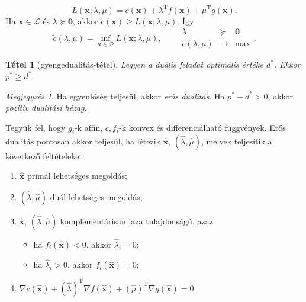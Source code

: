 \documentclass[DIV=15,appendixprefix]{scrreprt}
\newtheorem*{tetel}{Tétel}
\theoremstyle{definition}
\theoremstyle{remark}
\newtheorem*{megj}{Megjegyzés}
\DeclareMathOperator{\T}{T}
\begin{document}
%
\begin{equation*}\tag{Lagrange-függvény}
	L \left( \mathbf{ x };{} \lambda,{} \mu \right) = c \left( \mathbf{ x } \right) + \lambda^{ \T }
	f \left( \mathbf{ x }	\right) + \mu^{ \T } g \left( \mathbf{ x }	\right).
\end{equation*}
Ha $ \mathbf{ x } \in \mathcal{ L } $ és $ \lambda \succeq \mathbf{ 0 } $, akkor $ c \left(
\mathbf{ x } \right) \ge L \left( \mathbf{ x };{} \lambda,{} \mu \right) $. Így
\begin{equation}\tag{duális célfüggény, duális feladat}
	\tilde{ c } \left( \lambda,{} \mu \right) = \inf_{ \mathbf{ x } \in \mathcal{ D } } L \left(
	\mathbf{ x };{} \lambda,{} \mu \right), \qquad \begin{array}{rcl}
		\lambda										&		\succeq	&	\mathbf{ 0 }\\
		\hline
		\tilde{ c } \left( \lambda,{} \mu \right)	&	\rightarrow	&	\max
	\end{array}.
\end{equation}
\begin{tetel}[gyengedualitás-tétel]
	Legyen a duális feladat optimális értéke $ d^{ * } $. Ekkor $ p^{ * } \ge d^{ * } $.
\end{tetel}
\begin{megj}
	Ha egyenlőség teljesül, akkor \emph{erős dualitás}. Ha $ p^{ * } - d^{ * } > 0 $, akkor
	\emph{pozitív dualitási hézag}.
\end{megj}
%
Tegyük fel, hogy $ g_{ i } $-k affin, $ c,{} f_{ i } $-k konvex és differenciálható függvények. Erős dualitás pontosan akkor teljesül, ha létezik $ \hat{ \mathbf{ x } } $, $ \left( \hat{ \lambda }
,{} \hat{ \mu } \right) $, melyek teljesítik a következő feltételeket:
\begin{enumerate}[label = (KKT--\arabic{*}), ref = KKT--\arabic{*}, mode = unboxed,%
	labelindent = \parindent, leftmargin = *]
	\item\label{kkt1} $ \hat{ \mathbf{ x } } $ primál lehetséges megoldás;
	\item\label{kkt2} $ \left( \hat{ \lambda },{} \hat{ \mu } \right) $ duál lehetséges megoldás;
	\item\label{kkt3} $ \hat{ \mathbf{ x } } $, $ \left( \hat{ \lambda },{} \hat{ \mu } \right) $
	komplementárisan laza tulajdonságú, azaz
		\begin{itemize}
			\item ha $ f_{ i } \left( \hat{ \mathbf{ x } } \right) < 0 $, akkor
				$ \hat{ \lambda }_{ i } = 0 $;
			\item ha $ \hat{ \lambda }_{ i } > 0 $, akkor $ f_{ i } \left( \hat{ \mathbf{ x } }
				\right) = 0 $;
		\end{itemize}
	\item\label{kkt4} $ \nabla c \left( \hat{ \mathbf{ x } } \right) + \left( \hat{ \lambda }
		\right)^{ \T } \nabla f \left( \hat{ \mathbf{ x } } \right) + \left( \hat{ \mu }
		\right)^{ \T } \nabla g \left( \hat{ \mathbf{ x } } \right) = 0 $.
\end{enumerate}
\end{document}
